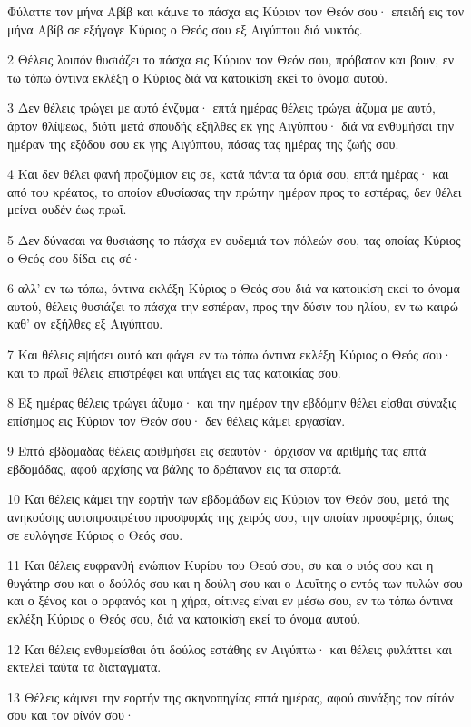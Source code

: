 \par Φύλαττε τον μήνα Αβίβ και κάμνε το πάσχα εις Κύριον τον Θεόν σου· επειδή εις τον μήνα Αβίβ σε εξήγαγε Κύριος ο Θεός σου εξ Αιγύπτου διά νυκτός.
\par 2 Θέλεις λοιπόν θυσιάζει το πάσχα εις Κύριον τον Θεόν σου, πρόβατον και βουν, εν τω τόπω όντινα εκλέξη ο Κύριος διά να κατοικίση εκεί το όνομα αυτού.
\par 3 Δεν θέλεις τρώγει με αυτό ένζυμα· επτά ημέρας θέλεις τρώγει άζυμα με αυτό, άρτον θλίψεως, διότι μετά σπουδής εξήλθες εκ γης Αιγύπτου· διά να ενθυμήσαι την ημέραν της εξόδου σου εκ γης Αιγύπτου, πάσας τας ημέρας της ζωής σου.
\par 4 Και δεν θέλει φανή προζύμιον εις σε, κατά πάντα τα όριά σου, επτά ημέρας· και από του κρέατος, το οποίον εθυσίασας την πρώτην ημέραν προς το εσπέρας, δεν θέλει μείνει ουδέν έως πρωΐ.
\par 5 Δεν δύνασαι να θυσιάσης το πάσχα εν ουδεμιά των πόλεών σου, τας οποίας Κύριος ο Θεός σου δίδει εις σέ·
\par 6 αλλ' εν τω τόπω, όντινα εκλέξη Κύριος ο Θεός σου διά να κατοικίση εκεί το όνομα αυτού, θέλεις θυσιάζει το πάσχα την εσπέραν, προς την δύσιν του ηλίου, εν τω καιρώ καθ' ον εξήλθες εξ Αιγύπτου.
\par 7 Και θέλεις εψήσει αυτό και φάγει εν τω τόπω όντινα εκλέξη Κύριος ο Θεός σου· και το πρωΐ θέλεις επιστρέφει και υπάγει εις τας κατοικίας σου.
\par 8 Εξ ημέρας θέλεις τρώγει άζυμα· και την ημέραν την εβδόμην θέλει είσθαι σύναξις επίσημος εις Κύριον τον Θεόν σου· δεν θέλεις κάμει εργασίαν.
\par 9 Επτά εβδομάδας θέλεις αριθμήσει εις σεαυτόν· άρχισον να αριθμής τας επτά εβδομάδας, αφού αρχίσης να βάλης το δρέπανον εις τα σπαρτά.
\par 10 Και θέλεις κάμει την εορτήν των εβδομάδων εις Κύριον τον Θεόν σου, μετά της ανηκούσης αυτοπροαιρέτου προσφοράς της χειρός σου, την οποίαν προσφέρης, όπως σε ευλόγησε Κύριος ο Θεός σου.
\par 11 Και θέλεις ευφρανθή ενώπιον Κυρίου του Θεού σου, συ και ο υιός σου και η θυγάτηρ σου και ο δούλός σου και η δούλη σου και ο Λευΐτης ο εντός των πυλών σου και ο ξένος και ο ορφανός και η χήρα, οίτινες είναι εν μέσω σου, εν τω τόπω όντινα εκλέξη Κύριος ο Θεός σου, διά να κατοικίση εκεί το όνομα αυτού.
\par 12 Και θέλεις ενθυμείσθαι ότι δούλος εστάθης εν Αιγύπτω· και θέλεις φυλάττει και εκτελεί ταύτα τα διατάγματα.
\par 13 Θέλεις κάμνει την εορτήν της σκηνοπηγίας επτά ημέρας, αφού συνάξης τον σίτόν σου και τον οίνόν σου·
